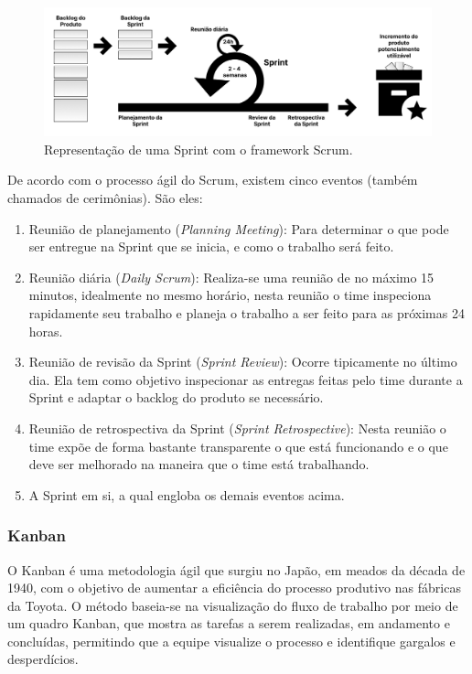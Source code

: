 \begin{figure}[h]
\centering
  \includegraphics[width=\columnwidth]{images/scrum.png}
  \caption{Representação de uma Sprint com o framework Scrum.}
  \label{fig:scrum}
\end{figure}

De acordo com o processo ágil do Scrum, existem cinco eventos (também chamados de cerimônias). São eles:

\begin{enumerate}
    \item Reunião de planejamento (\textit{Planning Meeting}): Para determinar o que pode ser entregue na Sprint que se inicia, e como o trabalho será feito.
    \item Reunião diária (\textit{Daily Scrum}): Realiza-se uma reunião de no máximo 15 minutos, idealmente no mesmo horário, nesta reunião o time inspeciona rapidamente seu trabalho e planeja o trabalho a ser feito para as próximas 24 horas.
    \item Reunião de revisão da Sprint (\textit{Sprint Review}): Ocorre tipicamente no último dia. Ela tem como objetivo inspecionar as entregas feitas pelo time durante a Sprint e adaptar o backlog do produto se necessário.
    \item Reunião de retrospectiva da Sprint (\textit{Sprint Retrospective}): Nesta reunião o time expõe de forma bastante transparente o que está funcionando e o que deve ser melhorado na maneira que o time está trabalhando.
    \item A Sprint em si, a qual engloba os demais eventos acima.
\end{enumerate}

\subsubsection{Kanban}\label{sssec:kanban}
O Kanban é uma metodologia ágil que surgiu no Japão, em meados da década de 1940, com o objetivo de aumentar a eficiência do processo produtivo nas fábricas da Toyota. O método baseia-se na visualização do fluxo de trabalho por meio de um quadro Kanban, que mostra as tarefas a serem realizadas, em andamento e concluídas, permitindo que a equipe visualize o processo e identifique gargalos e desperdícios. 

